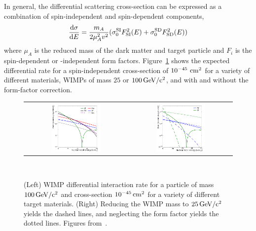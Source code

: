 In general, the differential scattering cross-section can be expressed as a combination of spin-independent and spin-dependent components,
\begin{equation}\label{eq:si_sd}
\frac{\mathrm{d}\sigma}{\mathrm{d} E} = \frac{m_A}{2\mu_{A}^2v^2}(\sigma_0^{\mathrm{SI}}F^2_{\mathrm{SI}}(E) + \sigma_0^{\mathrm{SD}}F^2_{\mathrm{SD}}(E))
\end{equation}
where $\mu_A$ is the reduced mass of the dark matter and target particle and $F_i$ is the spin-dependent or -independent form factors. Figure~\ref{fig:dm_rate} shows the expected differential rate for a spin-independent cross-section of $10^{-45}~\mathrm{cm^2}$ for a variety of different materials, WIMPs of mass $25$ or $100\,\mathrm{GeV/c^2}$, and with and without the form-factor correction.

\begin{figure}[htb]
    \begin{tabular}{cc}
    \includegraphics[width=0.5\textwidth]{figures/dm/rate_comp_v03} & \includegraphics[width=0.5\textwidth]{figures/dm/rate_var_vs01} \\
    \end{tabular}
    \caption{(Left) WIMP differential interaction rate for a particle of mass $100\,\mathrm{GeV/c^2}$ and cross-section $10^{-45}\,\mathrm{cm^2}$ for a variety of different target materials. (Right) Reducing the WIMP mass to $25\,\mathrm{GeV/c^2}$ yields the dashed lines, and neglecting the form factor yields the dotted lines. Figures from~\cite{Undagoitia:2015gya}.}~\label{fig:dm_rate}
\end{figure}

